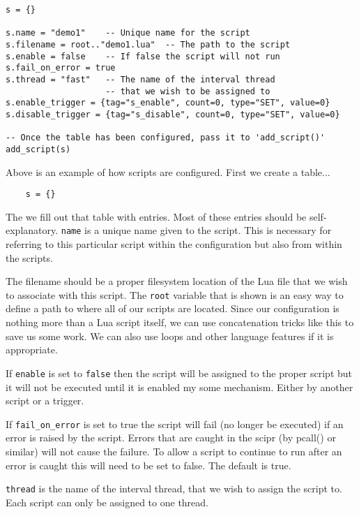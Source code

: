 \begin{verbatim}
s = {}

s.name = "demo1"    -- Unique name for the script
s.filename = root.."demo1.lua"  -- The path to the script
s.enable = false    -- If false the script will not run
s.fail_on_error = true
s.thread = "fast"   -- The name of the interval thread
                    -- that we wish to be assigned to
s.enable_trigger = {tag="s_enable", count=0, type="SET", value=0}
s.disable_trigger = {tag="s_disable", count=0, type="SET", value=0}

-- Once the table has been configured, pass it to 'add_script()'
add_script(s)

\end{verbatim}

Above is an example of how scripts are configured.  First we create a table...

\begin{verbatim}
	s = {}
\end{verbatim}

The we fill out that table with entries.  Most of these entries should be self-explanatory.  \texttt{name}
is a unique name given to the script.  This is necessary for referring to this particular script
within the configuration but also from within the scripts.

The filename should be a proper filesystem location of the Lua file that we wish to associate with this script.
The \texttt{root} variable that is shown is an easy way to define a path to where all of our scripts are
located.  Since our configuration is nothing more than a Lua script itself, we can use concatenation
tricks like this to save us some work.  We can also use loops and other language features if it is
appropriate.

If \texttt{enable} is set to \texttt{false} then the script will be assigned to the proper script but
it will not be executed until it is enabled my some mechanism.  Either by another script or a trigger.

If \texttt{fail\_on\_error} is set to true the script will fail (no longer be executed) if
an error is raised by the script.  Errors that are caught in the scipr (by pcall() or similar)
will not cause the failure.  To allow a script to continue to run after an error is caught
this will need to be set to false.  The default is true.

\texttt{thread} is the name of the interval thread, that we wish to assign the script to.  Each
script can only be assigned to one thread.

